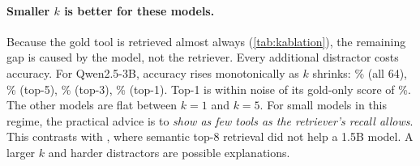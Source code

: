 \paragraph{Smaller $k$ is better for these models.}
Because the gold tool is retrieved almost always (\cref{tab:kablation}), the remaining gap is caused by the model, not the retriever. Every additional distractor costs accuracy.
For Qwen2.5-3B, accuracy rises monotonically as $k$ shrinks: \KAccQwenThreeKSixtyFour\% (all 64), \KAccQwenThreeKFive\% (top-5), \KAccQwenThreeKThree\% (top-3), \KAccQwenThreeKOne\% (top-1). Top-1 is within noise of its gold-only score of \AccQwenThreeNOne\%.
The other models are flat between $k{=}1$ and $k{=}5$.
For small models in this regime, the practical advice is to \emph{show as few tools as the retriever's recall allows}.
This contrasts with \citet{singla2026agentweave}, where semantic top-8 retrieval did not help a 1.5B model. A larger $k$ and harder distractors are possible explanations.

\begin{table}[t]
  \centering
  \caption{Effect of $k$ (seed-0 catalogs, 100 queries; strict accuracy, \%). $^\dagger$Lenient accuracy for Llama-3.2-3B. The bottom row is the share of queries for which the gold tool is among the tools shown.}
  \label{tab:kablation}
  \small
  
\end{table}
